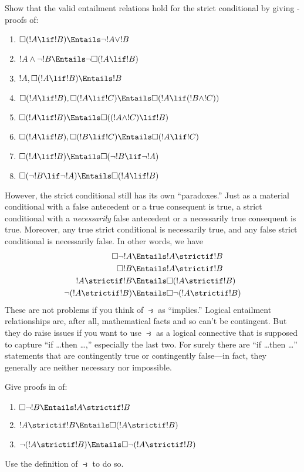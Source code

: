 \documentclass[../../../include/open-logic-section]{subfiles}
\begin{document}
\begin{prob}
  Show that the valid entailment relations hold for the strict
  conditional by giving -proofs of:
  \begin{enumerate}
  \item  $\Box(!A \lif !B) \Entails \lnot !A \lor !B$
  \item $!A \land \lnot !B \Entails \lnot\Box(!A \lif !B)$
  \item $!A, \Box(!A \lif !B) \Entails !B$
  \item $\Box(!A \lif !B), \Box(!A \lif !C) \Entails \Box(!A \lif (!B
    \land !C))$
  \item $\Box(!A \lif !B) \Entails \Box((!A \land !C) \lif !B)$
  \item $\Box(!A \lif !B), \Box(!B \lif !C) \Entails \Box(!A
    \lif !C)$
  \item $\Box(!A \lif !B) \Entails \Box(\lnot !B \lif \lnot !A)$
  \item $\Box(\lnot !B \lif \lnot !A) \Entails \Box(!A \lif !B)$
  \end{enumerate}
  \end{prob}

However, the strict conditional still has its own ``paradoxes.'' Just
as a material conditional with a false antecedent or a true consequent
is true, a strict conditional with a \emph{necessarily} false
antecedent or a necessarily true consequent is true. Moreover, any
true strict conditional is necessarily true, and any false strict
conditional is necessarily false. In other words, we have
\begin{align}
  \Box \lnot !A & \Entails !A \strictif !B\\
  \Box !B & \Entails !A \strictif !B\\
  !A \strictif !B& \Entails \Box(!A \strictif !B)\\
  \lnot(!A \strictif !B) & \Entails \Box\lnot(!A \strictif !B)
\end{align}
These are not problems if you think of $\strictif$ as ``implies.''
Logical entailment relationships are, after all, mathematical facts and so
can't be contingent. But they do raise issues if you want to use
$\strictif$ as a logical connective that is supposed to capture ``if
\dots then \dots,'' especially the last two. For surely there are ``if
\dots then \dots'' statements that are contingently true or
contingently false---in fact, they generally are neither necessary nor
impossible.

\begin{prob}
  Give proofs in  of:
  \begin{enumerate}
    \item  $\Box \lnot !B \Entails !A \strictif !B$
    \item $!A \strictif !B \Entails \Box(!A \strictif !B)$
    \item $\lnot(!A \strictif !B)  \Entails \Box\lnot(!A \strictif !B)$
  \end{enumerate}
  Use the definition of $\strictif$ to do so.
\end{prob}
\end{document}
